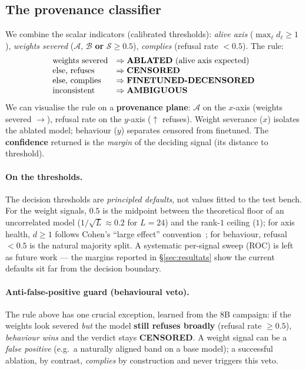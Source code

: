 \documentclass[11pt,a4paper]{article}
\theoremstyle{definition}
\theoremstyle{plain}
\begin{document}
\subsection{The provenance classifier}\label{sec:classif}
We combine the scalar indicators (calibrated thresholds): \emph{alive axis}
($\max_\ell d_\ell\ge 1$), \emph{weights severed} ($\mathcal{A}$, $\mathcal{B}$
\textbf{or} $\mathcal{S}\ge 0.5$), \emph{complies} (refusal rate $<0.5$). The rule:
\[
\begin{array}{l@{\quad}l}
  \text{weights severed} & \Rightarrow \textbf{ABLATED}\ (\text{alive axis expected})\\
  \text{else, refuses} & \Rightarrow \textbf{CENSORED}\\
  \text{else, complies} & \Rightarrow \textbf{FINETUNED-DECENSORED}\\
  \text{inconsistent} & \Rightarrow \textbf{AMBIGUOUS}
\end{array}
\]
We can visualise the rule on a \textbf{provenance plane}: $\mathcal{A}$ on the
$x$-axis (weights severed $\rightarrow$), refusal rate on the $y$-axis ($\uparrow$
refuses). Weight severance ($x$) isolates the ablated model; behaviour ($y$)
separates censored from finetuned. The \textbf{confidence} returned is the
\emph{margin} of the deciding signal (its distance to threshold).

\paragraph{On the thresholds.} The decision thresholds are \emph{principled
defaults}, not values fitted to the test bench. For the weight signals, $0.5$ is the
midpoint between the theoretical floor of an uncorrelated model
($1/\sqrt{L}\approx 0.2$ for $L=24$) and the rank-$1$ ceiling ($1$); for axis health,
$d\ge 1$ follows Cohen's ``large effect'' convention~\cite{cohen1988}; for behaviour,
refusal~$<0.5$ is the natural majority split. A systematic per-signal sweep (ROC) is
left as future work --- the margins reported in \S\ref{sec:resultats} show the current
defaults sit far from the decision boundary.

\paragraph{Anti-false-positive guard (behavioural veto).} The rule above has one
crucial exception, learned from the $8$B campaign: if the weights look severed
\emph{but} the model \textbf{still refuses broadly} (refusal rate $\ge 0.5$),
\emph{behaviour wins} and the verdict stays \textbf{CENSORED}. A weight signal can be
a \emph{false positive} (e.g.\ a naturally aligned band on a base model); a
successful ablation, by contrast, \emph{complies} by construction and never triggers
this veto.
\end{document}
